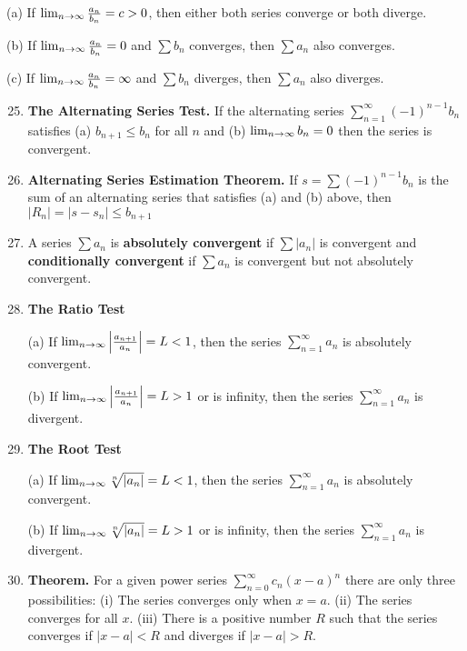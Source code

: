 {\begin{enumerate}
(a) If $\lim_{n\rightarrow\infty}\frac{a_n}{b_n}=c>0$, then either both series
converge or both diverge. 

(b) If $\lim_{n\rightarrow\infty}\frac{a_n}{b_n}=0$ and $\sum b_n$ converges,
then $\sum a_n$ also converges. 

(c) If $\lim_{n\rightarrow\infty}\frac{a_n}{b_n}=\infty$ and $\sum b_n$
diverges, then $\sum a_n$ also diverges.
\end{enumerate}

\begin{enumerate}
\setcounter{enumi}{24}
\item {\bf The Alternating Series Test.} If the alternating series
$\sum_{n=1}^{\infty}(-1)^{n-1}b_n$ satisfies (a) $b_{n+1}\leq b_n$ for
all $n$ and (b) $\lim_{n\rightarrow\infty}b_n=0$ then the series is
convergent.

\item {\bf Alternating Series Estimation Theorem.} If
$s=\sum(-1)^{n-1}b_n$ is the sum of an alternating series that
satisfies (a) and (b) above, then $|R_n|=|s-s_n|\leq b_{n+1}$
\end{enumerate}

\begin{enumerate}
\setcounter{enumi}{26}
\item A series $\sum a_n$ is {\bf absolutely convergent} if $\sum
|a_n|$ is convergent and {\bf conditionally convergent} if $\sum a_n$
is convergent but not absolutely convergent.

\item {\bf The Ratio Test}

(a) If $\lim_{n\rightarrow\infty}\left|\frac{a_{n+1}}{a_n}\right|=L<1$, then
the series $\sum_{n=1}^{\infty}a_n$ is absolutely convergent.

(b) If $\lim_{n\rightarrow\infty}\left|\frac{a_{n+1}}{a_n}\right|=L>1$ or is
infinity, then the series $\sum_{n=1}^{\infty}a_n$ is divergent.

\item {\bf The Root Test}

(a) If $\lim_{n\rightarrow\infty}\sqrt[n]{|a_n|}=L<1$, then the series
$\sum_{n=1}^{\infty}a_n$ is absolutely convergent.

(b) If $\lim_{n\rightarrow\infty}\sqrt[n]{|a_n|}=L>1$ or is infinity, then
the series $\sum_{n=1}^{\infty}a_n$ is divergent.
\end{enumerate}

\begin{enumerate}
\setcounter{enumi}{29}
\item {\bf Theorem.} For a given power series
$\sum_{n=0}^{\infty}c_n(x-a)^n$ there are only three possibilities:
(i) The series converges only when $x=a$.
(ii) The series converges for all $x$.
(iii) There is a positive number $R$ such that the series converges if
$|x-a|<R$ and diverges if $|x-a|>R$.
\end{enumerate}

}
